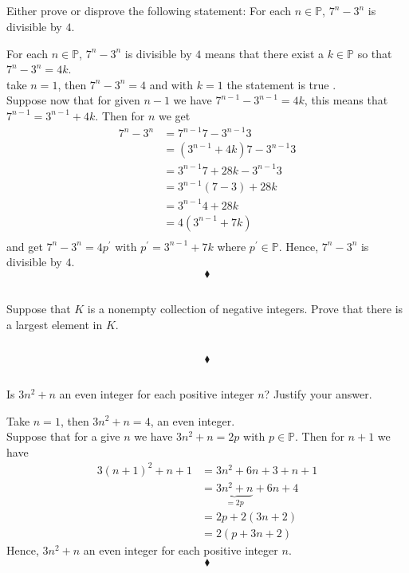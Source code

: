 \subsection{}
\begin{tcolorbox}
Either prove or disprove the following statement: For each $n\in \mathbb{P}$, $7^n-3^n$ is divisible by $4$.
\end{tcolorbox}
$$ $$
 For each $n\in \mathbb{P}$, $7^n-3^n$ is divisible by $4$ means that there exist a $k\in \mathbb{P}$ so that $7^n-3^n=4k$.\\
 take $n=1$, then $7^n-3^n=4$ and with $k=1$ the statement is true .\\
 Suppose now that for  given $n-1$ we have $7^{n-1}-3^{n-1}=4k$,  this means that $7^{n-1}=3^{n-1}+4k$. Then for $n$ we get
 \begin{align*}
7^{n}-3^{n} &=  7^{n-1}7-3^{n-1}3\\
&=\left(3^{n-1}+4k\right)7-3^{n-1}3\\
&=3^{n-1}7+28k-3^{n-1}3\\
&=3^{n-1}(7-3)+28k\\
&=3^{n-1}4+28k\\
&=4\left(3^{n-1}+7k\right)\\
\end{align*}
 and get $7^{n}-3^{n}= 4p^{'}$ with $ p^{'}=3^{n-1}+7k$ where $ p^{'}\in \mathbb{P}$. Hence, $7^{n}-3^{n}$ is divisible by $4$.
$$\blacklozenge$$
\subsection{}
\begin{tcolorbox}
 Suppose that $K$ is a nonempty collection of negative integers. Prove that there is a largest element in $K$. 
\end{tcolorbox}
$$ $$

$$\blacklozenge$$
\subsection{}
\begin{tcolorbox}
Is $3n^2+ n$ an even integer for each positive integer $n$? Justify your answer.
\end{tcolorbox}
$$ $$
Take $n=1$, then $3n^2+ n= 4$, an even integer.\\
Suppose that for a give $n$ we have $3n^2+ n= 2p$ with $p\in \mathbb{P}$. Then for $n+1$ we have
 \begin{align*}
3(n+1)^2+ n+1 &= 3n^2+6n + 3 + n+1\\
&= \underbrace{3n^2+ n}_{=2p} +6n + 4\\
&= 2p +2(3n + 2)\\
&= 2(p +3n + 2)
\end{align*}
Hence, $3n^2+ n$ an even integer for each positive integer $n$.
$$\blacklozenge$$


